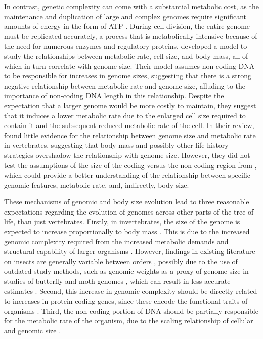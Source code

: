 \documentclass[11pt]{article}
\begin{document}
In contrast, genetic complexity can come with a substantial metabolic cost, as the maintenance and duplication of large and complex genomes require significant amounts of energy in the form of ATP \citep{genomeenergetics}. During cell division, the entire genome must be replicated accurately, a process that is metabolically intensive because of the need for numerous enzymes and regulatory proteins. \cite{Kozlowski} developed a model to study the relationships between metabolic rate, cell size, and body mass, all of which in turn correlate with genome size. Their model assumes non-coding DNA to be responsible for increases in genome sizes, suggesting that there is a strong negative relationship between metabolic rate and genome size, alluding to the importance of non-coding DNA length in this relationship. Despite the expectation that a larger genome would be more costly to maintain, they suggest that it induces a lower metabolic rate due to the enlarged cell size required to contain it and the subsequent reduced metabolic rate of the cell. In their review, \cite{genomeandmetabolism} found little evidence for the relationship between genome size and metabolic rate in vertebrates, suggesting that body mass and possibly other life-history strategies overshadow the relationship with genome size. However, they did not test the assumptions of the size of the coding versus the non-coding region from \cite{Kozlowski}, which could provide a better understanding of the relationship between specific genomic features, metabolic rate, and, indirectly, body size.

These mechanisms of genomic and body size evolution lead to three reasonable expectations regarding the evolution of genomes across other parts of the tree of life, than just vertebrates. Firstly, in invertebrates, the size of the genome is expected to increase proportionally to body mass \citep{propagule}. This is due to the increased genomic complexity required from the increased metabolic demands and structural capability of larger organisms \citep{system-scaling, prok-to-human-complexity}. However, findings in existing literature on insects are generally variable between orders \citep{propagule}, possibly due to the use of outdated study methods, such as genomic weights as a proxy of genome size in studies of butterfly and moth genomes \citep{lep-genomes1, lep-genomes2}, which can result in less accurate estimates \citep{wgs}. Second, this increase in genomic complexity should be directly related to increases in protein coding genes, since these encode the functional traits of organisms \citep{protein-function}. Third, the non-coding portion of DNA should be partially responsible for the metabolic rate of the organism, due to the scaling relationship of cellular and genomic size \citep{Kozlowski}. 
\end{document}

